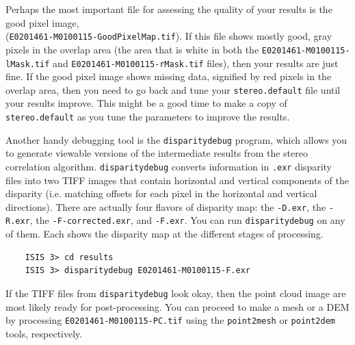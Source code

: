 %

Perhaps the most important file for assessing the quality of your
results is the good pixel image,
\\ (\texttt{E0201461-M0100115-GoodPixelMap.tif}).  If this file shows
mostly good, gray pixels in the overlap area (the area that is white
in both the \texttt{E0201461-M0100115-lMask.tif} and
\texttt{E0201461-M0100115-rMask.tif} files), then your results are
just fine.  If the good pixel image shows missing data, signified by
red pixels in the overlap area, then you need to go back and tune your
\texttt{stereo.default} file until your results improve.  This might
be a good time to make a copy of \texttt{stereo.default} as you tune
the parameters to improve the results.

Another handy debugging tool is the \texttt{disparitydebug} program,
which allows you to generate viewable versions of the intermediate
results from the stereo correlation algorithm.
\texttt{disparitydebug} converts information in \texttt{.exr}
disparity files into two TIFF images that contain horizontal and
vertical components of the disparity (i.e. matching offsets for each
pixel in the horizontal and vertical directions).  There are actually
four flavors of disparity map: the \texttt{-D.exr}, the
\texttt{-R.exr}, the \texttt{-F-corrected.exr}, and \texttt{-F.exr}.
You can run \texttt{disparitydebug} on any of them.  Each shows the
disparity map at the different stages of processing.

\begin{verbatim}
    ISIS 3> cd results
    ISIS 3> disparitydebug E0201461-M0100115-F.exr
\end{verbatim}

If the TIFF files from \texttt{disparitydebug} look okay, then the
point cloud image are most likely ready for post-processing.  You can
proceed to make a mesh or a \ac{DEM} by processing
\texttt{E0201461-M0100115-PC.tif} using the \texttt{point2mesh} or
\texttt{point2dem} tools, respectively.

